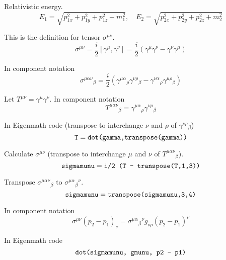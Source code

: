 Relativistic energy.
\begin{equation*}
E_1=\sqrt{p_{1x}^2+p_{1y}^2+p_{1z}^2+m_1^2},\quad
E_2=\sqrt{p_{2x}^2+p_{2y}^2+p_{2z}^2+m_2^2}
\end{equation*}

This is the definition for tensor $\sigma^{\mu\nu}$.
\begin{equation*}
\sigma^{\mu\nu}=\frac{i}{2}\left[\gamma^\mu,\gamma^\nu\right]
=\frac{i}{2}\left(\gamma^\mu\gamma^\nu-\gamma^\nu\gamma^\mu\right)
\end{equation*}

In component notation
\begin{equation*}
\sigma^{\mu\alpha\nu}{}_\beta
=\frac{i}{2}\left(\gamma^{\mu\alpha}{}_\rho\gamma^{\nu\rho}{}_\beta
-\gamma^{\nu\alpha}{}_\rho\gamma^{\mu\rho}{}_\beta\right)
\end{equation*}

Let $T^{\mu\nu}=\gamma^\mu\gamma^\nu$.
In component notation
\begin{equation*}
T^{\mu\alpha\nu}{}_\beta
=\gamma^{\mu\alpha}{}_\rho\gamma^{\nu\rho}{}_\beta
\end{equation*}

In Eigenmath code (transpose to interchange $\nu$ and $\rho$ of $\gamma^{\nu\rho}{}_\beta$)
\begin{equation*}
\text{\tt T}=\text{\tt dot(gamma,transpose(gamma))}
\end{equation*}

Calculate $\sigma^{\mu\nu}$ (transpose to interchange $\mu$ and $\nu$ of $T^{\mu\alpha\nu}{}_\beta$).
\begin{equation*}
\text{\tt sigmamunu}=\text{\tt i/2 (T - transpose(T,1,3))}
\end{equation*}

Transpose $\sigma^{\mu\alpha\nu}{}_\beta$ to $\sigma^{\mu\alpha}{}_\beta{}^\nu$.
\begin{equation*}
\text{\tt sigmamunu}=\text{\tt transpose(sigmamunu,3,4)}
\end{equation*}

In component notation
\begin{equation*}
\sigma^{\mu\nu}(p_2-p_1)_\nu
=\sigma^{\mu\alpha}{}_\beta{}^{\nu}g_{\nu\rho}(p_2-p_1)^\rho
\end{equation*}

In Eigenmath code
\begin{equation*}
\text{\tt dot(sigmamunu, gmunu, p2 - p1)}
\end{equation*}


